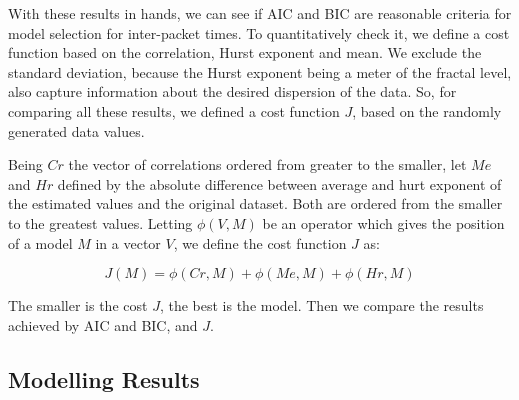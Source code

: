 With these results in hands, we can see if AIC and BIC are reasonable criteria for model selection for inter-packet times. To quantitatively check it, we define a cost function based on the correlation, Hurst exponent and mean. We exclude the standard deviation, because the Hurst exponent being a meter of the fractal level, also capture information about the desired dispersion of the data. So, for comparing all these results, we defined a cost function $J$, based on the randomly generated data values.

Being $Cr$ the vector of correlations ordered from greater to the smaller, let $Me$ and $Hr$ defined by the absolute difference between average and hurt exponent of the estimated values and the original dataset. Both are ordered from the smaller to the greatest values. Letting $\phi(V, M)$ be an operator which gives the position of a model $M$ in a vector $V$, we define the cost function $J$ as:


\begin{equation}
J(M) = \phi(Cr, M) + \phi(Me, M) + \phi(Hr, M)
\end{equation}

The smaller is the cost $J$, the best is the model. Then we compare the results achieved by AIC and BIC, and $J$.

\subsection{Modelling Results}


